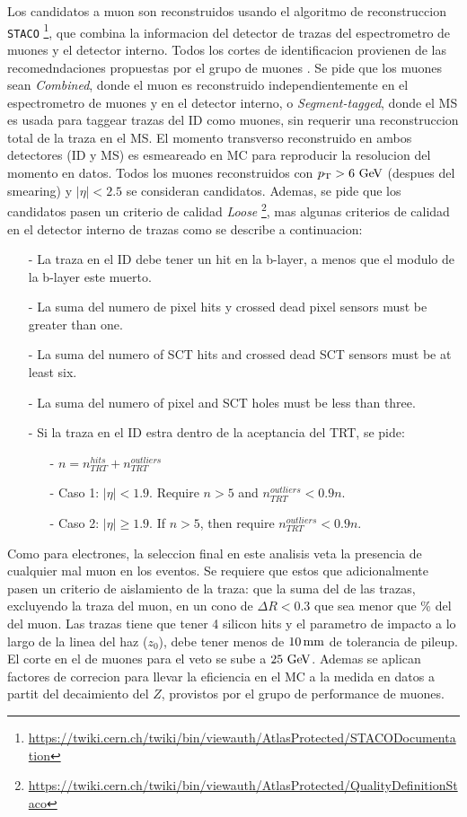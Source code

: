 Los candidatos a muon son reconstruidos usando el algoritmo de reconstruccion
\texttt{STACO} \footnote{\url{https://twiki.cern.ch/twiki/bin/viewauth/AtlasProtected/STACODocumentation}},
que combina la informacion del detector de trazas del espectrometro
de muones y el detector interno. Todos los cortes de identificacion
provienen de las recomedndaciones propuestas por el grupo de muones \cite{MCPTwiki}.
Se pide que los muones sean \textit{Combined}, donde el muon es reconstruido
independientemente en el espectrometro de muones y en el detector interno, o
\textit{Segment-tagged}, donde el MS es usada para taggear trazas del ID
como muones, sin requerir una reconstruccion total de la traza en el MS.
El momento transverso reconstruido en ambos detectores (ID y MS)
es esmeareado en MC para reproducir la resolucion del momento en datos.
Todos los muones reconstruidos con $\pt>6 \gev$ (despues del smearing) y $|\eta|<2.5$
se consideran candidatos.
Ademas, se pide que los candidatos pasen un criterio de calidad \textit{Loose}
\footnote{\url{https://twiki.cern.ch/twiki/bin/viewauth/AtlasProtected/QualityDefinitionStaco}},
mas algunas criterios de calidad en el detector interno de trazas como se describe a continuacion:
\begin{itemize}\itemsep0.1cm
\item[-] La traza en el ID debe tener un hit en la b-layer, a menos que el modulo de la b-layer este muerto.
\item[-] La suma del numero de pixel hits y crossed dead pixel sensors must be greater than one.
\item[-] La suma del numero of SCT hits and crossed dead SCT sensors must be at least six.
\item[-] La suma del numero of pixel and SCT holes must be less than three.
\item[-] Si la traza en el ID estra dentro de la aceptancia del TRT, se pide:
  \begin{itemize}\itemsep0.1cm
  \item[-] $n = n_{TRT}^{hits} + n_{TRT}^{outliers}$
  \item[-] Caso 1: $|\eta| < 1.9$. Require $n > 5$ and $n_{TRT}^{outliers} < 0.9n$.
  \item[-] Caso 2: $|\eta| \geq 1.9$. If $n > 5$, then require $n_{TRT}^{outliers} < 0.9n$.
  \end{itemize}
\end{itemize}

Como para electrones, la seleccion final en este analisis veta la presencia
de cualquier mal muon en los eventos.
Se requiere que estos que adicionalmente pasen un criterio de aislamiento de la
traza: que la suma del {\pt} de las trazas, excluyendo la traza del muon, en un
cono de $\Delta R < 0.3$ que sea menor que \unit[12]{\%} del {\pt} del muon.
Las trazas tiene que tener 4 silicon hits y el parametro de impacto a lo largo de
la linea del haz ($z_{0}$), debe tener menos de $\unit[10]{mm}$ de tolerancia de pileup.
El corte en el {\pt} de muones para el veto se sube a $25 \gev$. Ademas se aplican
factores de correcion para llevar la eficiencia en el MC a la medida en datos a partit
del decaimiento del $Z$, provistos por el grupo de performance de muones.

